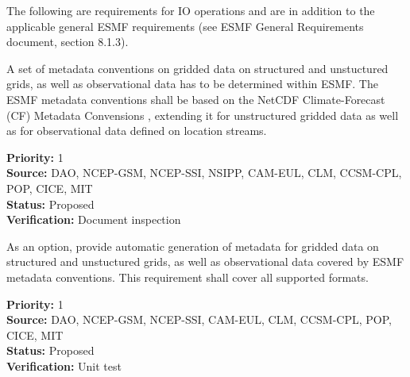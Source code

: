

The following are requirements for IO operations and are in addition
to the applicable general ESMF requirements (see ESMF General 
Requirements document, section 8.1.3).



A set of metadata conventions on gridded data on structured and
unstuctured grids, as well as observational data has to be determined
within ESMF. The ESMF metadata conventions shall be based on the
NetCDF Climate-Forecast (CF) Metadata Convensions
\cite{NetCDF_CF_v1_beta3}, extending it for unstructured gridded data
as well as for observational data defined on location streams.

\begin{reqlist}
{\bf Priority:} 1 \\
{\bf Source:} DAO, NCEP-GSM, NCEP-SSI, NSIPP, CAM-EUL, CLM, CCSM-CPL, POP, CICE, MIT \\
{\bf Status:} Proposed \\
{\bf Verification:} Document inspection \\
\end{reqlist}


As an option, provide automatic generation of metadata for gridded
data on structured and unstuctured grids, as well as observational
data covered by ESMF metadata conventions. This requirement shall
cover all supported formats.

\begin{reqlist}
{\bf Priority:} 1 \\
{\bf Source:} DAO, NCEP-GSM, NCEP-SSI, CAM-EUL, CLM, CCSM-CPL, POP, CICE, MIT \\
{\bf Status:} Proposed \\
{\bf Verification:} Unit test \\
\end{reqlist}



